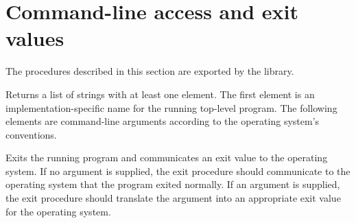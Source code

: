 \section{Command-line access and exit values}
\label{programlibsection}

The procedures described in this section are exported by the
 library.

\begin{entry}{%
}

Returns a list of strings with
at least one element.  The first element is an implementation-specific
name for the running top-level program.  The following elements are command-line
arguments according to the operating system's conventions.
\end{entry}

\begin{entry}{%
}

Exits the running program and communicates an exit value to the 
operating system.  If no argument is supplied, the {\cf exit}
procedure should communicate to the operating system that the program 
exited normally.  If an argument is supplied, the {\cf exit} procedure 
should translate the argument into an appropriate exit value for the 
operating system.
\end{entry}

